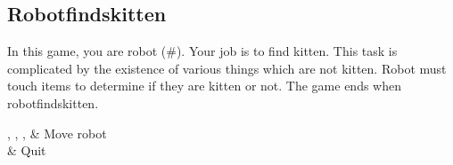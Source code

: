 \subsection{Robotfindskitten}
In this game, you are robot (\#). Your job is to find kitten. This task
is complicated by the existence of various things which are not kitten.
Robot must touch items to determine if they are kitten or not. The game
ends when robotfindskitten.

\begin{btnmap}
    \PluginUp, \PluginDown, \PluginLeft, \PluginRight
    & Move robot\\

    \PluginCancel
    & Quit\\
\end{btnmap}

